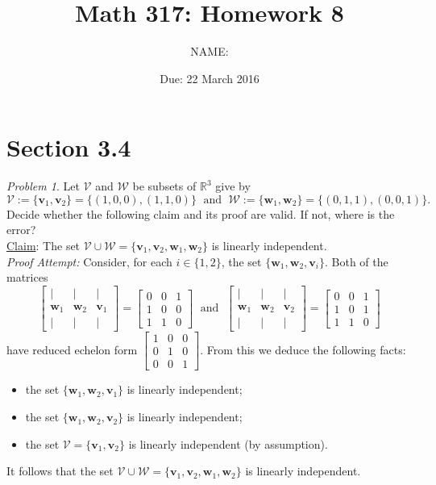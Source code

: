 \documentclass[fleqn,11pt]{paper}
\author         {NAME:                     }
\title{Math 317: Homework 8}
\date{Due: 22 March 2016}
\theoremstyle{remark}
\newtheorem{problem}{Problem}
\newtheorem*{solution}{{\bf Solution}}
\newcommand\R{\fld{R}}
\renewcommand{\vec}[1]{\mathbf{#1}}
\newcommand{\<}{\ensuremath{\langle}}
\renewcommand{\>}{\ensuremath{\rangle}}
\newcommand\fld[1]{\ensuremath{\mathbb{#1}}}
\newcommand\vv{\vec{v}}
\newcommand\vw{\vec{w}}
\newcommand\sV{\ensuremath{\mathcal V}}
\newcommand\sW{\ensuremath{\mathcal W}}
\begin{document}
\maketitle
\section*{Section 3.4}
\begin{problem}
Let $\sV$ and $\sW$ be subsets of $\R^3$ give by
\[
\sV :=\{\vv_1, \vv_2\} = \{(1,0,0), (1,1,0)\} \; \text{ and } \;
\sW := \{\vw_1, \vw_2\} =\{(0,1,1), (0,0,1)\}.
\]
Decide whether the following claim and its proof are valid.  If not, where is the error?
\\[5pt]
\underline{Claim}: The set $\sV \cup \sW = \{\vv_1, \vv_2, \vw_1, \vw_2\}$ is linearly independent. \\[4pt]
{\it Proof Attempt:} Consider, for each $i\in \{1, 2\}$, the set $\{\vw_1, \vw_2, \vv_i\}$.
Both of the matrices
\[
\begin{bmatrix*}
    | & | & |\\
    \vw_1& \vw_2 & \vv_1\\
    | & | & |
  \end{bmatrix*}=
  \begin{bmatrix*}
    0  & 0 & 1\\
    1  & 0 & 0\\
    1  & 1 & 0
  \end{bmatrix*}
\; \text{ and } \;
\begin{bmatrix*}
    | & | & |\\
    \vw_1& \vw_2 & \vv_2\\
    | & | & |
  \end{bmatrix*}=
  \begin{bmatrix*}
    0  & 0 & 1\\
    1  & 0 & 1\\
    1  & 1 & 0
  \end{bmatrix*}\]
  have reduced echelon form
  $\begin{bmatrix*}
    1  & 0 & 0\\
    0  & 1 & 0\\
    0  & 0 & 1
  \end{bmatrix*}$.
From this we deduce the following facts:
\begin{itemize}
\item the set $\{\vw_1, \vw_2, \vv_1\}$ is linearly independent;
\item the set $\{\vw_1, \vw_2, \vv_2\}$ is linearly independent;
\item the set $\sV = \{\vv_1, \vv_2\}$ is linearly independent (by assumption).
\end{itemize}
It follows that the set $\sV \cup \sW = \{\vv_1, \vv_2, \vw_1, \vw_2\}$ is linearly independent. 
\end{problem}
\end{document}
